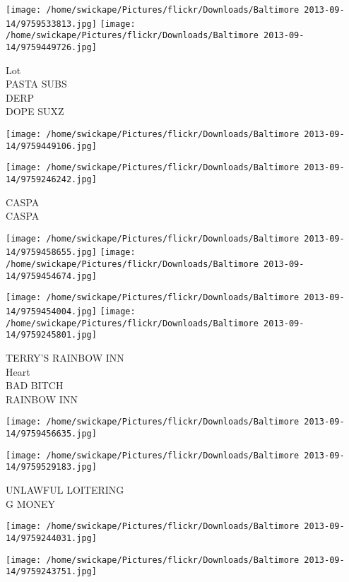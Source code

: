 \documentclass[10pt,letterpaper]{article}
\begin{document}
\texttt{[image: /home/swickape/Pictures/flickr/Downloads/Baltimore 2013-09-14/9759533813.jpg]}
\texttt{[image: /home/swickape/Pictures/flickr/Downloads/Baltimore 2013-09-14/9759449726.jpg]}

Lot\\
PASTA SUBS\\
DERP\\
DOPE SUXZ\\
\pagebreak

\texttt{[image: /home/swickape/Pictures/flickr/Downloads/Baltimore 2013-09-14/9759449106.jpg]}

\vspace{0.25in}
\texttt{[image: /home/swickape/Pictures/flickr/Downloads/Baltimore 2013-09-14/9759246242.jpg]}

CASPA\\
CASPA\\
\pagebreak

\texttt{[image: /home/swickape/Pictures/flickr/Downloads/Baltimore 2013-09-14/9759458655.jpg]}
\texttt{[image: /home/swickape/Pictures/flickr/Downloads/Baltimore 2013-09-14/9759454674.jpg]}

\texttt{[image: /home/swickape/Pictures/flickr/Downloads/Baltimore 2013-09-14/9759454004.jpg]}
\texttt{[image: /home/swickape/Pictures/flickr/Downloads/Baltimore 2013-09-14/9759245801.jpg]}

TERRY'S RAINBOW INN\\
Heart\\
BAD BITCH\\
RAINBOW INN\\
\pagebreak

\texttt{[image: /home/swickape/Pictures/flickr/Downloads/Baltimore 2013-09-14/9759456635.jpg]}

\vspace{0.25in}
\texttt{[image: /home/swickape/Pictures/flickr/Downloads/Baltimore 2013-09-14/9759529183.jpg]}

UNLAWFUL LOITERING\\
G MONEY\\
\pagebreak

\texttt{[image: /home/swickape/Pictures/flickr/Downloads/Baltimore 2013-09-14/9759244031.jpg]}

\vspace{0.25in}
\texttt{[image: /home/swickape/Pictures/flickr/Downloads/Baltimore 2013-09-14/9759243751.jpg]}
\end{document}

